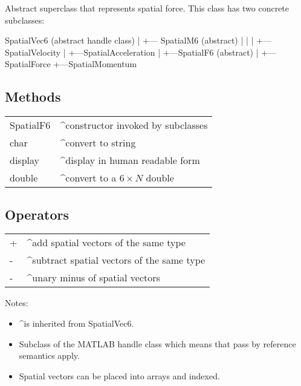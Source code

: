 Abstract superclass that represents spatial force.  This class has two
concrete subclasses:

\begin{Code}
    SpatialVec6 (abstract handle class)
      |
      +--- SpatialM6 (abstract)
      |     |
      |     +---SpatialVelocity
      |     +---SpatialAcceleration
      |
      +---SpatialF6 (abstract)
           |
           +---SpatialForce
           +---SpatialMomentum

\end{Code}

\subsection*{Methods}
\begin{longtable}{lp{120mm}}
SpatialF6 & \textasciicircum constructor invoked by subclasses\\ 
char & \textasciicircum convert to string\\ 
display & \textasciicircum display in human readable form\\ 
double & \textasciicircum convert to a $6 \times N$ double\\ 
\end{longtable}\vspace{1ex}

\subsection*{Operators}
\begin{longtable}{lp{120mm}}
+ & \textasciicircum add spatial vectors of the same type\\ 
- & \textasciicircum subtract spatial vectors of the same type\\ 
- & \textasciicircum unary minus of spatial vectors\\ 
\end{longtable}\vspace{1ex}


Notes:

\begin{itemize}
  \item \textasciicircum  is inherited from SpatialVec6.
  \item Subclass of the MATLAB handle class which means that pass by reference semantics    apply.
  \item Spatial vectors can be placed into arrays and indexed.
\end{itemize}

